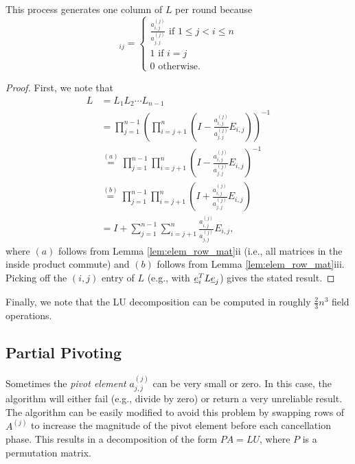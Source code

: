 \begin{theorem}
This process generates one column of $L$ per round because
\begin{equation*}
[ L ]_{ij} =
\begin{cases}
\frac{a^{(j)}_{i,j}}{a^{(j)}_{j,j}} \textrm{  if  } 1 \leq j < i \leq n \\
1 \textrm{  if  } i=j \\
0 \textrm{  otherwise}.
\end{cases}
\end{equation*}
\end{theorem}
\begin{proof}
First, we note that
\begin{align*}
L & =  L_1 L_2 \cdots L_{n-1} \\
& = \prod_{j=1}^{n-1} \left(  \prod_{i=j+1}^n \left( I - \frac{a^{(j)}_{i,j}}{a^{(j)}_{j,j}} E_{i,j} \right) \right)^{-1} \\
& \stackrel{(a)}{=} \prod_{j=1}^{n-1}\prod_{i=j+1}^n \left( I - \frac{a^{(j)}_{i,j}}{a^{(j)}_{j,j}} E_{i,j} \right)^{-1} \\
& \stackrel{(b)}{=} \prod_{j=1}^{n-1}\prod_{i=j+1}^n \left( I + \frac{a^{(j)}_{i,j}}{a^{(j)}_{j,j}} E_{i,j} \right) \\
& = I + \sum_{j=1}^{n-1}\sum_{i=j+1}^n \frac{a^{(j)}_{i,j}}{a^{(j)}_{j,j}} E_{i,j},
\end{align*}
where $(a)$ follows from Lemma \ref{lem:elem_row_mat}ii (i.e., all matrices in the inside product commute) and $(b)$ follows from Lemma \ref{lem:elem_row_mat}iii.
Picking off the $(i,j)$ entry of $L$ (e.g., with $\underline{e}_i^T L \underline{e}_j$) gives the stated result.
\end{proof}
Finally, we note that the LU decomposition can be computed in roughly $\frac{2}{3}n^3$ field operations.

\subsection{Partial Pivoting}

Sometimes the \emph{pivot element} $a^{(j)}_{j,j}$ can be very small or zero.
In this case, the algorithm will either fail (e.g., divide by zero) or return a very unreliable result.
The algorithm can be easily modified to avoid this problem by swapping rows of $A^{(j)}$ to increase the magnitude of the pivot element before each cancellation phase.
This results in a decomposition of the form $P A = L U$, where $P$ is a permutation matrix.


